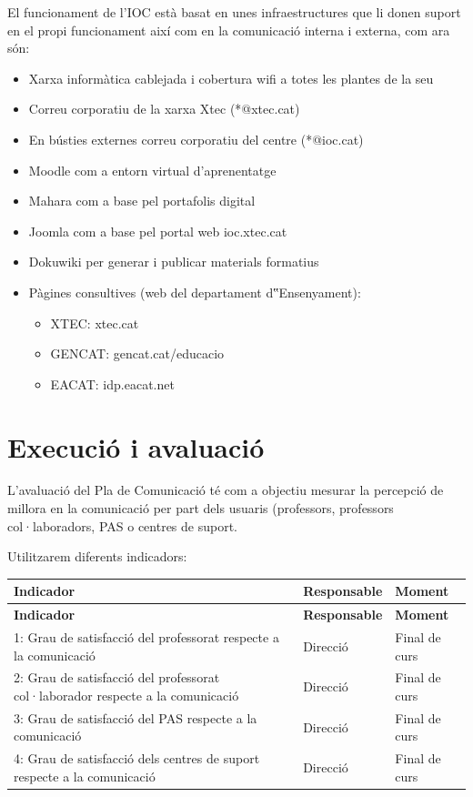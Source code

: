 \documentclass[fontsize=10pt,%
paper=a4,%
DIV=14,%
pagesize=auto,%
parskip=half,
captions=tableheading,%
numbers=noenddot,%
toc=graduated%
]{scrartcl}
\renewcommand{\arraystretch}{1.75}%
\renewcommand{\arraystretch}{1.75}%
\begin{document}
El funcionament de l'IOC està basat en unes infraestructures que li donen suport en el propi funcionament així com en la comunicació interna i externa, com ara són:

\begin{itemize}
\item Xarxa informàtica cablejada i cobertura wifi a totes les plantes de la seu
\item Correu corporatiu de la xarxa Xtec (*@xtec.cat)
\item En bústies externes correu corporatiu del centre (*@ioc.cat)
\item Moodle com a entorn virtual d'aprenentatge
\item Mahara com a base pel portafolis digital
\item Joomla com a base pel portal web ioc.xtec.cat
\item Dokuwiki per generar i publicar materials formatius
\item Pàgines consultives (web del departament d‟Ensenyament):
      \begin{itemize}
      \item XTEC: xtec.cat
      \item GENCAT: gencat.cat/educacio
      \item EACAT: idp.eacat.net
      \end{itemize}
\end{itemize}

\section{Execució i avaluació}\label{sec:execiaval}

L'avaluació del Pla de Comunicació té com a objectiu mesurar la percepció de
millora en la comunicació per part dels usuaris (professors, professors col·laboradors, PAS o centres de suport.

Utilitzarem diferents indicadors:


\small{
\setlength{\tabcolsep}{10pt}
\renewcommand{\arraystretch}{1.5}
\begin{longtable}{p{10.5cm}p{1.7cm}p{1.7cm}}
\hline
\textbf{Indicador}                                                             & \textbf{Responsable} & \textbf{Moment} \\
\hline \endfirsthead
\hline
\textbf{Indicador}                                                             & \textbf{Responsable} & \textbf{Moment} \\
\hline \endhead
1: Grau de satisfacció del professorat respecte a la comunicació               & Direcció             & Final de curs   \\
2: Grau de satisfacció del professorat col·laborador respecte a la comunicació & Direcció             & Final de curs   \\
3: Grau de satisfacció del PAS respecte a la comunicació                       & Direcció             & Final de curs   \\
4: Grau de satisfacció dels centres de suport respecte a la comunicació        & Direcció             & Final de curs   \\
\end{longtable}
}%
\end{document}
